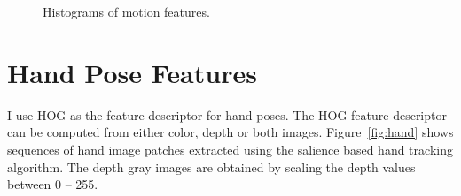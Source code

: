 \begin{figure}[!tbh]
\centering
{}
\caption{Histograms of motion features.}
\end{figure}


\section{Hand Pose Features}
I use HOG as the feature descriptor for hand poses. The HOG feature descriptor
can be computed from either color, depth or both images. Figure~\ref{fig:hand}
shows sequences of hand image patches extracted using the salience based hand
tracking algorithm. The depth gray images are obtained by scaling the depth
values between 0 -- 255.

